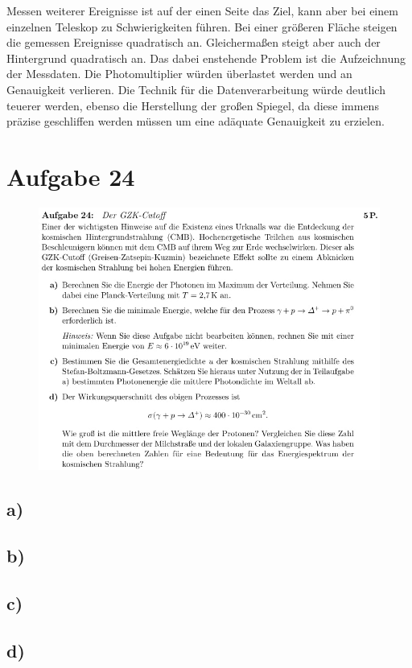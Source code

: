     \justifying Messen weiterer Ereignisse ist auf der einen Seite das Ziel, kann aber bei einem einzelnen Teleskop zu Schwierigkeiten
    führen. Bei einer größeren Fläche steigen die gemessen Ereignisse quadratisch an. Gleichermaßen steigt aber auch der Hintergrund quadratisch an. 
    Das dabei enstehende Problem ist die Aufzeichnung der Messdaten. Die Photomultiplier würden überlastet werden und an Genauigkeit verlieren. Die
    Technik für die Datenverarbeitung würde deutlich teuerer werden, ebenso die Herstellung der großen Spiegel, da diese immens präzise geschliffen werden 
    müssen um eine adäquate Genauigkeit zu erzielen. 

\section{Aufgabe 24}

    \begin{figure}[H]
        \centering
        \includegraphics[width=\textwidth]{images/Aufgabe24.jpg}
        \label{fig:5}
    \end{figure}

\subsection{a)}

\subsection{b)}

\subsection{c)}

\subsection{d)}

